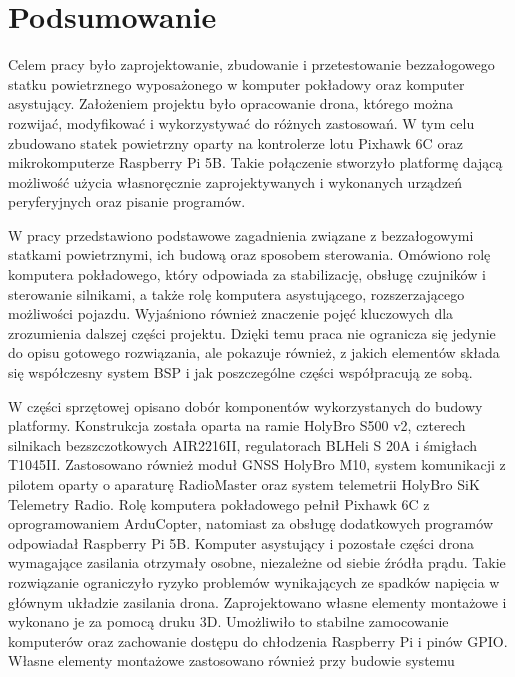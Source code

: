\documentclass[a4paper,12pt]{book}
\renewcommand{\chaptermark}[1]{\markboth{#1}{}}
\begin{document}
\chapter*{Podsumowanie}
\chaptermark{Podsumowanie} %
    Celem pracy było zaprojektowanie, zbudowanie i przetestowanie bezzałogowego statku powietrznego wyposażonego w komputer pokładowy oraz komputer asystujący. Założeniem projektu 
    było opracowanie drona, którego można rozwijać, modyfikować i wykorzystywać 
    do różnych zastosowań. W tym celu zbudowano statek powietrzny oparty na kontrolerze lotu Pixhawk 6C oraz mikrokomputerze Raspberry Pi 5B. Takie połączenie stworzyło platformę 
    dającą możliwość użycia własnoręcznie zaprojektywanych i wykonanych urządzeń peryferyjnych oraz pisanie programów.\par
    W pracy przedstawiono podstawowe zagadnienia związane z bezzałogowymi statkami powietrznymi, ich budową oraz sposobem sterowania. Omówiono rolę komputera pokładowego, który 
    odpowiada za stabilizację, obsługę czujników i sterowanie silnikami, a także rolę komputera asystującego, rozszerzającego możliwości pojazdu. Wyjaśniono również znaczenie 
    pojęć kluczowych dla zrozumienia dalszej części projektu. Dzięki temu praca nie ogranicza się jedynie do opisu gotowego rozwiązania, ale pokazuje również, z jakich elementów 
    składa się współczesny system BSP i jak poszczególne części współpracują ze sobą.\par
    W części sprzętowej opisano dobór komponentów wykorzystanych do budowy platformy. Konstrukcja została oparta na ramie HolyBro S500 v2, czterech silnikach bezszczotkowych 
    AIR2216II, regulatorach BLHeli S 20A i śmigłach T1045II. Zastosowano również moduł GNSS HolyBro M10, system komunikacji z pilotem oparty o aparaturę RadioMaster oraz system 
    telemetrii HolyBro SiK Telemetry Radio. Rolę komputera pokładowego pełnił Pixhawk 6C z oprogramowaniem ArduCopter, natomiast za obsługę dodatkowych programów odpowiadał 
    Raspberry Pi 5B. Komputer asystujący i pozostałe części drona wymagające zasilania otrzymały osobne, niezależne od siebie źródła prądu. Takie rozwiązanie ograniczyło 
    ryzyko problemów wynikających ze spadków napięcia w głównym układzie zasilania drona. Zaprojektowano własne elementy montażowe i wykonano je za pomocą druku 3D. Umożliwiło to 
    stabilne zamocowanie komputerów oraz zachowanie dostępu do chłodzenia Raspberry Pi i pinów GPIO. Własne elementy montażowe zastosowano również przy budowie systemu 
\end{document}
